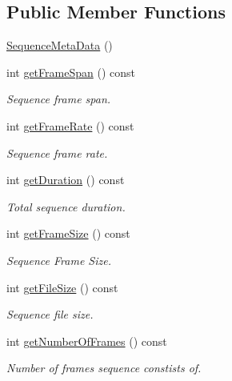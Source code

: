 \subsection*{Public Member Functions}
\begin{DoxyCompactItemize}
\item 
\hyperlink{classwtl_1_1_sequence_meta_data_a309c905124f9595f60aa2aff5ac593c1}{Sequence\+Meta\+Data} ()
\item 
int \hyperlink{classwtl_1_1_sequence_meta_data_aee08a065e63606f91ee12526a4e53b3f}{get\+Frame\+Span} () const
\begin{DoxyCompactList}\small\item\em Sequence frame span. \end{DoxyCompactList}\item 
int \hyperlink{classwtl_1_1_sequence_meta_data_ad9793ec615f6544465c30c150182a4e3}{get\+Frame\+Rate} () const
\begin{DoxyCompactList}\small\item\em Sequence frame rate. \end{DoxyCompactList}\item 
int \hyperlink{classwtl_1_1_sequence_meta_data_ae2883595f742f14a43447a9d2c7fcc8c}{get\+Duration} () const
\begin{DoxyCompactList}\small\item\em Total sequence duration. \end{DoxyCompactList}\item 
int \hyperlink{classwtl_1_1_sequence_meta_data_a95f60019209c2778c8a723d4d5c8fc85}{get\+Frame\+Size} () const
\begin{DoxyCompactList}\small\item\em Sequence Frame Size. \end{DoxyCompactList}\item 
int \hyperlink{classwtl_1_1_sequence_meta_data_a24e3ad706253552c32204774227aefd3}{get\+File\+Size} () const
\begin{DoxyCompactList}\small\item\em Sequence file size. \end{DoxyCompactList}\item 
int \hyperlink{classwtl_1_1_sequence_meta_data_a640215e7856760949b17be5e2131e2f8}{get\+Number\+Of\+Frames} () const
\begin{DoxyCompactList}\small\item\em Number of frames sequence constists of. \end{DoxyCompactList}\end{DoxyCompactItemize}
